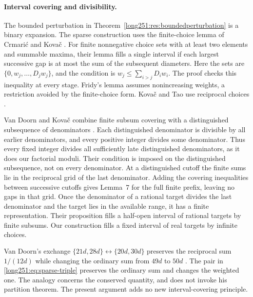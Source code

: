 \documentclass[11pt]{article}
\begin{document}
\paragraph{Interval covering and divisibility.}
The bounded perturbation in Theorem~\ref{long251:res:boundedperturbation}
is a binary expansion.  The sparse construction uses the finite-choice
lemma of Crmari\'{c} and Kova\v{c} \cite[Lemma~4]{crmarickovac2025}.
For finite nonnegative choice sets with at least two elements and
summable maxima, their lemma fills a single interval if each largest
successive gap is at most the sum of the subsequent diameters.
Here the sets are $\{0,w_j,\ldots,D_jw_j\}$, and the condition is
$w_j\le\sum_{i>j}D_iw_i$.  The proof checks this inequality at every
stage.  Fridy's lemma \cite[Lemma, p.~194]{fridy1966} assumes nonincreasing
weights, a restriction avoided by the finite-choice form.
Kova\v{c} and Tao use reciprocal choices
\cite[Lemma~5.1, Theorem~2.5]{kovactao2024}.

Van Doorn and Kova\v{c} combine finite subsum covering with a distinguished
subsequence of denominators \cite[Lemma~7, Proposition~8]{vandoornkovac2025}.
Each distinguished denominator is divisible by all earlier denominators,
and every positive integer divides some denominator.  Thus every fixed
integer divides all sufficiently late distinguished denominators, as it
does our factorial moduli.  Their condition is imposed on the distinguished
subsequence, not on every denominator.  At a distinguished cutoff the
finite sums lie in the reciprocal grid of the last denominator.
Adding the covering inequalities between successive cutoffs gives
Lemma~7 for the full finite prefix, leaving no gaps in that grid.
Once the denominator of a rational target divides the last denominator
and the target lies in the available range, it has a finite representation.
Their proposition fills a half-open interval of rational targets by finite
subsums.  Our construction fills a fixed interval of real targets by
infinite choices.

Van Doorn's exchange
$\{21d,28d\}\leftrightarrow\{20d,30d\}$ preserves the reciprocal sum
$1/(12d)$ while changing the ordinary sum from $49d$ to $50d$
\cite[proof of Theorem~3]{vandoorn2025}.
The pair in \eqref{long251:eq:sparse-triple} preserves the ordinary sum
and changes the weighted one.  The analogy concerns the conserved
quantity, and does not invoke his partition theorem.  The present
argument adds no new interval-covering principle.
\end{document}
